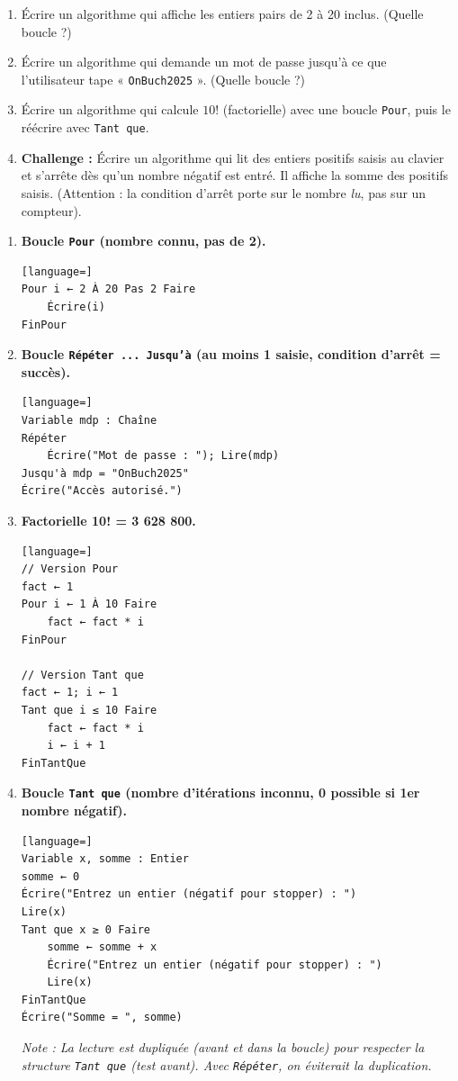 \documentclass[11pt]{article}
\begin{document}
\begin{exercice}
\begin{enumerate}
    \item Écrire un algorithme qui affiche les entiers pairs de 2 à 20 inclus. (Quelle boucle ?)
    \item Écrire un algorithme qui demande un mot de passe jusqu'à ce que l'utilisateur tape « \texttt{OnBuch2025} ». (Quelle boucle ?)
    \item Écrire un algorithme qui calcule $10!$ (factorielle) avec une boucle \texttt{Pour}, puis le réécrire avec \texttt{Tant que}.
    \item \textbf{Challenge :} Écrire un algorithme qui lit des entiers positifs saisis au clavier et s'arrête dès qu'un nombre négatif est entré. Il affiche la somme des positifs saisis. (Attention : la condition d'arrêt porte sur le nombre \emph{lu}, pas sur un compteur).
\end{enumerate}
\end{exercice}

\begin{corrige}[Exercice 1]
\begin{enumerate}
    \item \textbf{Boucle \texttt{Pour} (nombre connu, pas de 2).}
\begin{lstlisting}[language=]
Pour i ← 2 À 20 Pas 2 Faire
    Écrire(i)
FinPour
\end{lstlisting}
    \item \textbf{Boucle \texttt{Répéter ... Jusqu'à} (au moins 1 saisie, condition d'arrêt = succès).}
\begin{lstlisting}[language=]
Variable mdp : Chaîne
Répéter
    Écrire("Mot de passe : "); Lire(mdp)
Jusqu'à mdp = "OnBuch2025"
Écrire("Accès autorisé.")
\end{lstlisting}
    \item \textbf{Factorielle 10! = 3 628 800.}
\begin{lstlisting}[language=]
// Version Pour
fact ← 1
Pour i ← 1 À 10 Faire
    fact ← fact * i
FinPour

// Version Tant que
fact ← 1; i ← 1
Tant que i ≤ 10 Faire
    fact ← fact * i
    i ← i + 1
FinTantQue
\end{lstlisting}
    \item \textbf{Boucle \texttt{Tant que} (nombre d'itérations inconnu, 0 possible si 1er nombre négatif).}
\begin{lstlisting}[language=]
Variable x, somme : Entier
somme ← 0
Écrire("Entrez un entier (négatif pour stopper) : ")
Lire(x)
Tant que x ≥ 0 Faire
    somme ← somme + x
    Écrire("Entrez un entier (négatif pour stopper) : ")
    Lire(x)
FinTantQue
Écrire("Somme = ", somme)
\end{lstlisting}
\textit{Note : La lecture est dupliquée (avant et dans la boucle) pour respecter la structure \texttt{Tant que} (test avant). Avec \texttt{Répéter}, on éviterait la duplication.}
\end{enumerate}
\end{corrige}
\end{document}
